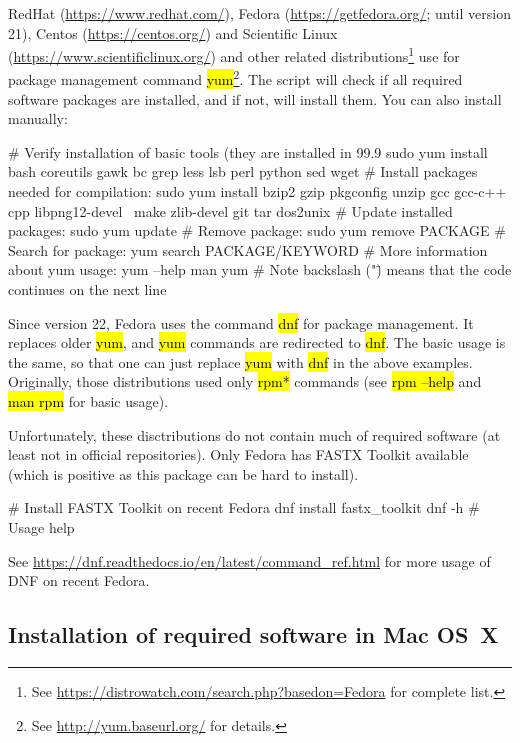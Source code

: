\documentclass[a4paper, 11pt, twoside]{article}
\renewcommand{\texttt}[1]{\hl{\ttfamily #1}}
\begin{document}
RedHat (\url{https://www.redhat.com/}), Fedora (\url{https://getfedora.org/}; until version 21), Centos (\url{https://centos.org/}) and Scientific Linux (\url{https://www.scientificlinux.org/}) and other related distributions\footnote{See \url{https://distrowatch.com/search.php?basedon=Fedora} for complete list.} use for package management command \texttt{yum}\footnote{See \url{http://yum.baseurl.org/} for details.}. The script will check if all required software packages are installed, and if not, will install them. You can also install manually:

\begin{bashcode}
  # Verify installation of basic tools (they are installed in 99.9%
  sudo yum install bash coreutils gawk bc grep less lsb perl python sed wget
  # Install packages needed for compilation:
  sudo yum install bzip2 gzip pkgconfig unzip gcc gcc-c++ cpp libpng12-devel \
    make zlib-devel git tar dos2unix
  # Update installed packages:
  sudo yum update
  # Remove package:
  sudo yum remove PACKAGE
  # Search for package:
  yum search PACKAGE/KEYWORD
  # More information about yum usage:
  yum --help
  man yum
  # Note backslash ("\") means that the code continues on the next line
\end{bashcode}

Since version 22, Fedora uses the command \texttt{dnf} for package management. It replaces older \texttt{yum}, and \texttt{yum} commands are redirected to \texttt{dnf}. The basic usage is the same, so that one can just replace \texttt{yum} with \texttt{dnf} in the above examples. Originally, those distributions used only \texttt{rpm*} commands (see \texttt{rpm --help} and \texttt{man rpm} for basic usage). 

Unfortunately, these disctributions do not contain much of required software (at least not in official repositories). Only Fedora has FASTX Toolkit available (which is positive as this package can be hard to install).

\begin{bashcode}
  # Install FASTX Toolkit on recent Fedora
  dnf install fastx_toolkit
  dnf -h # Usage help
\end{bashcode}

See \url{https://dnf.readthedocs.io/en/latest/command_ref.html} for more usage of DNF on recent Fedora.

\subsection{Installation of required software in Mac OS~X}
\label{required-mac}
\end{document}
